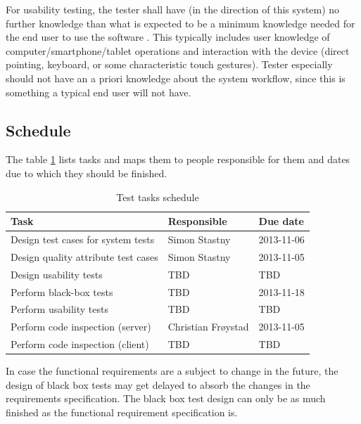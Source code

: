 \documentclass[11pt]{book}
\begin{document}
For usability testing, the tester shall have (in the direction of this system) no further knowledge than what is expected to be a minimum knowledge needed for the end user to use the software . This typically includes user knowledge of computer/smartphone/tablet operations and interaction with the device (direct pointing, keyboard, or some characteristic touch gestures). Tester especially should not have an a priori knowledge about the system workflow, since this is something a typical end user will not have.
\subsection{Schedule}

The table \ref{tab:test_plan_schedule} lists tasks and maps them to people responsible for them and dates due to which they should be finished. 

\begin{table}[H]
    \centering
    \begin{tabular}{| l | l | l |}
        \hline
        Task                                & Responsible             & Due date       \\ \hline
        Design test cases for system tests  & Simon Stastny           & 2013-11-06     \\ \hline
        Design quality attribute test cases & Simon Stastny           & 2013-11-05     \\ \hline
        Design usability tests              & TBD                     & TBD            \\ \hline
        Perform black-box tests             & TBD                     & 2013-11-18     \\ \hline
        Perform usability tests             & TBD                     & TBD            \\ \hline
        Perform code inspection (server)    & Christian Frøystad      & 2013-11-05     \\ \hline
        Perform code inspection (client)    & TBD                     & TBD            \\ \hline
    \end{tabular}
    \caption{Test tasks schedule}
    \label{tab:test_plan_schedule}
\end{table}


In case the functional requirements are a subject to change in the future, the design of black box tests may get delayed to absorb the changes in the requirements specification. The black box test design can only be as much finished as the functional requirement specification is.
\end{document}
